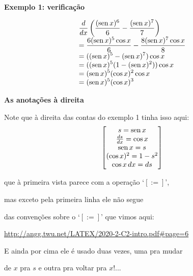 \documentclass[oneside,12pt]{article}
\begin{document}
\newpage


{\bf Exemplo 1: verificação}

$$\begin{array}[t]{l}
  \displaystyle \frac{d}{dx} \left(\frac{(\operatorname{sen} x)^6}{6} - \frac{(\operatorname{sen} x)^7}{7}\right) \\
  \displaystyle = \frac{6(\operatorname{sen} x)^5\cos x}{6} - \frac{8(\operatorname{sen} x)^7\cos x}{8} \\
  \displaystyle = ((\operatorname{sen} x)^5 - (\operatorname{sen} x)^7) \cos x \\
  \displaystyle = ((\operatorname{sen} x)^5(1-(\operatorname{sen} x)^2)) \cos x \\
  \displaystyle = (\operatorname{sen} x)^5(\cos x)^2 \cos x \\
  \displaystyle = (\operatorname{sen} x)^5(\cos x)^3 \\
  \end{array}
$$

\newpage


{\bf As anotações à direita}

\ssk

Note que à direita das contas do exemplo 1 tinha isso aqui:
%
$$\left [\begin{matrix}s = \operatorname{sen} x \\
       \frac{ds}{dx} = \cos x \\
       \operatorname{sen} x = s \\
       (\cos x)^2 = 1 - s^2 \\
       \cos x \, dx = ds
  \end{matrix}\right ]
$$

que à primeira vista parece com a operação `$[:=]$',

mas exceto pela primeira linha ele não segue 

das convenções sobre o `$[:=]$' que vimos aqui:

\ssk

\url{http://angg.twu.net/LATEX/2020-2-C2-intro.pdf\#page=6}

\ssk

E ainda por cima ele é usado duas vezes, uma pra mudar

de $x$ pra $s$ e outra pra voltar pra $x$!...

\newpage

\end{document}
